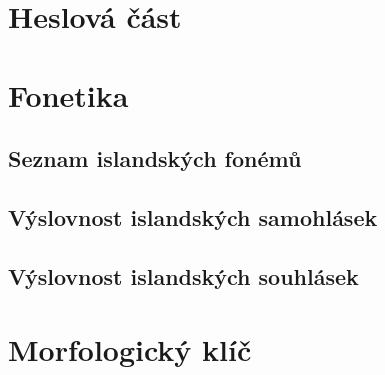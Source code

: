 \chapter{Heslová část}




\ifinputletters

\cleardoublepage

\dictionarygeometry
\pagestyle{myheadings}



\restoregeometry
\pagestyle{plain}

\fi



\ifinputphon

\cleardoublepage

\chapter{Fonetika}                               \label{sec:phon}

\section{Seznam islandských fonémů}              \label{sec:phon_phonems}
\clearpage

\section{Výslovnost islandských samohlásek}      \label{sec:phon_vowels}
\clearpage

\section{Výslovnost islandských souhlásek}       \label{sec:phon_consonants}

\fi


\ifinputmorpho

\cleardoublepage

\chapter{Morfologický klíč}                      \label{sec:morpho}

